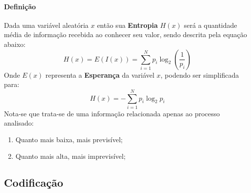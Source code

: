\documentclass{article}
\begin{document}
\begin{multicols}{2}
        \paragraph{Definição}Dada uma variável aleatória $x$ então sua \textbf{Entropia} $H(x)$ será a quantidade média de informação recebida ao conhecer seu valor, sendo descrita pela equação abaixo:
            \begin{equation*}
                H(x) = E(I(x)) = \sum_{i=1}^{N}p_{i}\log_{2}\left(\frac{1}{p_{i}}\right)
            \end{equation*}
        Onde $E(x)$ representa a \textbf{Esperança} da variável $x$, podendo ser simplificada para:
            \begin{equation}
                \boxed{
                    H(x) = -\sum_{i=1}^{N}p_{i}\log_{2}p_{i}
                }
            \end{equation}
        Nota-se que trata-se de uma informação relacionada apenas ao processo analisado:
            \begin{enumerate}[noitemsep]
                \item Quanto mais baixa, mais previsível; 
                \item Quanto mais alta, mais imprevisível; 
            \end{enumerate}
\end{multicols}
        
        \subsection{Codificação}
\end{document}
